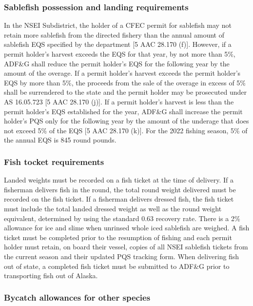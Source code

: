 \documentclass[
]{article}
\begin{document}
\hypertarget{sablefish-possession-and-landing-requirements}{%
\subsubsection{Sablefish possession and landing requirements}\label{sablefish-possession-and-landing-requirements}}

In the NSEI Subdistrict, the holder of a CFEC permit for sablefish may not retain more sablefish from the directed fishery than the annual amount of sablefish EQS specified by the department {[}5 AAC 28.170 (f){]}. However, if a permit holder's harvest exceeds the EQS for that year, by not more than 5\%, ADF\&G shall reduce the permit holder's EQS for the following year by the amount of the overage. If a permit holder's harvest exceeds the permit holder's EQS by more than 5\%, the proceeds from the sale of the overage in excess of 5\% shall be surrendered to the state and the permit holder may be prosecuted under AS 16.05.723 {[}5 AAC 28.170 (j){]}. If a permit holder's harvest is less than the permit holder's EQS established for the year, ADF\&G shall increase the permit holder's PQS only for the following year by the amount of the underage that does not exceed 5\% of the EQS {[}5 AAC 28.170 (k){]}. For the 2022 fishing season, 5\% of the annual EQS is 845 round pounds.

\hypertarget{fish-tocket-requirements}{%
\subsubsection{Fish tocket requirements}\label{fish-tocket-requirements}}

Landed weights must be recorded on a fish ticket at the time of delivery. If a fisherman delivers fish in the round, the total round weight delivered must be recorded on the fish ticket. If a fisherman delivers dressed fish, the fish ticket must include the total landed dressed weight as well as the round weight equivalent, determined by using the standard 0.63 recovery rate. There is a 2\% allowance for ice and slime when unrinsed whole iced sablefish are weighed. A fish ticket must be completed prior to the resumption of fishing and each permit holder must retain, on board their vessel, copies of all NSEI sablefish tickets from the current season and their updated PQS tracking form. When delivering fish out of state, a completed fish ticket must be submitted to ADF\&G prior to transporting fish out of Alaska.

\hypertarget{bycatch-allowances-for-other-species}{%
\subsubsection{Bycatch allowances for other species}\label{bycatch-allowances-for-other-species}}
\end{document}
